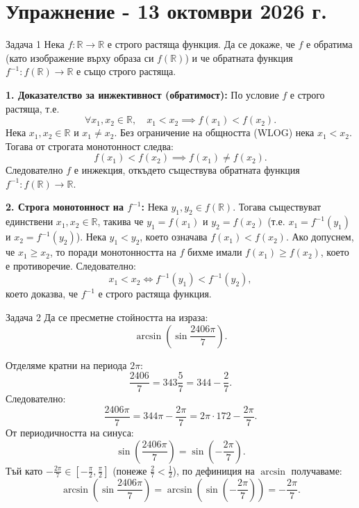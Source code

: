 
\section{Упражнение - 13 октомври 2026 г.}
\begin{problembox}{Задача 1}
Нека $f: \mathbb{R} \to \mathbb{R}$ е строго растяща функция. Да се докаже, че $f$ е обратима (като изображение върху образа си $f(\mathbb{R})$) и че обратната функция $f^{-1}: f(\mathbb{R}) \to \mathbb{R}$ е също строго растяща.
\end{problembox}

\begin{solution}
\textbf{1. Доказателство за инжективност (обратимост):}
По условие $f$ е строго растяща, т.е.
\[
\forall x_1, x_2 \in \mathbb{R}, \quad x_1 < x_2 \implies f(x_1) < f(x_2).
\]
Нека $x_1, x_2 \in \mathbb{R}$ и $x_1 \neq x_2$. Без ограничение на общността (WLOG) нека $x_1 < x_2$.
Тогава от строгата монотонност следва:
\[
f(x_1) < f(x_2) \implies f(x_1) \neq f(x_2).
\]
Следователно $f$ е инжекция, откъдето съществува обратната функция $f^{-1}: f(\mathbb{R}) \to \mathbb{R}$.

\textbf{2. Строга монотонност на $f^{-1}$:}
Нека $y_1, y_2 \in f(\mathbb{R})$. Тогава съществуват единствени $x_1, x_2 \in \mathbb{R}$, такива че $y_1 = f(x_1)$ и $y_2 = f(x_2)$ (т.е. $x_1 = f^{-1}(y_1)$ и $x_2 = f^{-1}(y_2)$).
Нека $y_1 < y_2$, което означава $f(x_1) < f(x_2)$.
Ако допуснем, че $x_1 \ge x_2$, то поради монотонността на $f$ бихме имали $f(x_1) \ge f(x_2)$, което е противоречие.
Следователно:
\[
x_1 < x_2 \iff f^{-1}(y_1) < f^{-1}(y_2),
\]
което доказва, че $f^{-1}$ е строго растяща функция.
\end{solution}


\begin{problembox}{Задача 2}
Да се пресметне стойността на израза:
\[
\arcsin\left(\sin \frac{2406\pi}{7}\right).
\]
\end{problembox}

\begin{solution}
Отделяме кратни на периода $2\pi$:
\[
\frac{2406}{7} = 343\frac{5}{7} = 344 - \frac{2}{7}.
\]
Следователно:
\[
\frac{2406\pi}{7} = 344\pi - \frac{2\pi}{7} = 2\pi \cdot 172 - \frac{2\pi}{7}.
\]
От периодичността на синуса:
\[
\sin\left(\frac{2406\pi}{7}\right) = \sin\left(-\frac{2\pi}{7}\right).
\]
Тъй като $-\frac{2\pi}{7} \in \left[-\frac{\pi}{2}, \frac{\pi}{2}\right]$ (понеже $\frac{2}{7} < \frac{1}{2}$), по дефиниция на $\arcsin$ получаваме:
\[
\arcsin\left(\sin \frac{2406\pi}{7}\right) = \arcsin\left(\sin\left(-\frac{2\pi}{7}\right)\right) = -\frac{2\pi}{7}.
\]
\end{solution}

